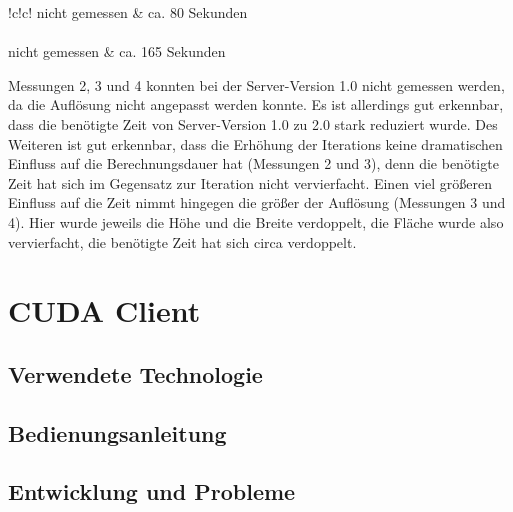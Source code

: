 \documentclass[12pt, onecolumn, notitlepage]{scrartcl}
\begin{document}
\begin{table}[H]
{\begin{tabular}{!{\color{black}\vrule}c!{\color{black}\vrule}c!{\color{black}\vrule}}
			\hline
			nicht
			gemessen     & ca.
			80 Sekunden                                                                                                                                                                            \\ 
			\hline
			        \\ 
			\hline
			nicht
			gemessen     & ca.
			165 Sekunden                                                                                                                                                                           \\
			\hline
		\end{tabular}
	}
	
\end{table}

Messungen 2, 3 und 4 konnten bei der Server-Version 1.0 nicht gemessen werden, da die Auflösung nicht angepasst werden konnte. Es ist allerdings gut erkennbar, dass die benötigte Zeit von Server-Version 1.0 zu 2.0 stark reduziert wurde. Des Weiteren ist gut erkennbar, dass die Erhöhung der Iterations keine dramatischen Einfluss auf die Berechnungsdauer hat (Messungen 2 und 3), denn die benötigte Zeit hat sich im Gegensatz zur Iteration nicht vervierfacht. Einen viel größeren Einfluss auf die Zeit nimmt hingegen die größer der Auflösung (Messungen 3 und 4). Hier wurde jeweils die Höhe und die Breite verdoppelt, die Fläche wurde also vervierfacht, die benötigte Zeit hat sich circa verdoppelt.


\section{CUDA Client}
\subsection{Verwendete Technologie}
\subsection{Bedienungsanleitung}
\subsection{Entwicklung und Probleme}
\end{document}

